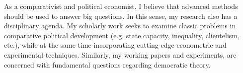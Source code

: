 \documentclass[10pt,stdletter,dateno,sigleft]{newlfm} %
\begin{document}
\begin{newlfm}


As a comparativist and political economist, I believe that advanced methods should be used to answer big questions. In this sense, my research also has a disciplinary agenda. My scholarly work seeks to examine classic problems in comparative political development (e.g. state capacity, inequality, clientelism, etc.), while at the same time incorporating cutting-edge econometric and experimental techniques. Similarly, my working papers and experiments, are concerned with fundamental questions regarding democratic theory.


\end{newlfm}
\end{document}
